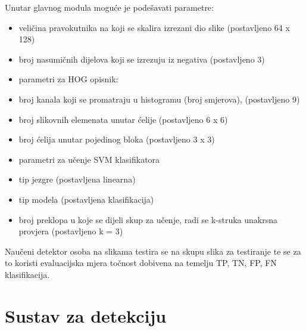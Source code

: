 \documentclass[utf8, seminar, numeric, times]{fer}
\begin{document}
Unutar glavnog modula moguće je podešavati parametre:
\begin{itemize}
\item veličina pravokutnika na koji se skalira izrezani dio slike (postavljeno 64 x 128)
\item broj nasumičnih dijelova koji se izrezuju iz negativa (postavljeno 3)
\item parametri za HOG opisnik:
\item broj kanala koji se promatraju u histogramu (broj smjerova), (postavljeno 9)
\item broj slikovnih elemenata unutar ćelije (postavljeno 6 x 6)
\item broj ćelija unutar pojedinog bloka (postavljeno 3 x 3)
\item parametri za učenje SVM klasifikatora
\item tip jezgre (postavljena linearna)
\item tip modela (postavljena klasifikacija)
\item broj preklopa u koje se dijeli skup za učenje, radi se k-struka unakrsna provjera (postavljeno k = 3)
\end{itemize}

Naučeni detektor osoba na slikama testira se na skupu slika za testiranje te se za to koristi evaluacijska mjera točnost dobivena na temelju TP, TN, FP, FN klasifikacija. 


\section{Sustav za detekciju}
\end{document}
